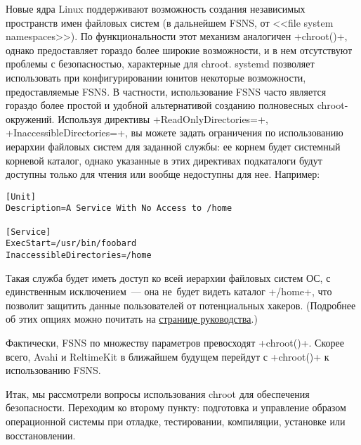 \documentclass[10pt,oneside,a4paper]{article}
\begin{document}
Новые ядра Linux поддерживают возможность создания независимых пространств имен
файловых систем (в дальнейшем FSNS, от <<file system namespaces>>). По
функциональности этот механизм аналогичен +chroot()+, однако предоставляет
гораздо более широкие возможности, и в нем отсутствуют проблемы с безопасностью,
характерные для chroot. systemd позволяет использовать при конфигурировании
юнитов некоторые возможности, предоставляемые FSNS. В частности, использование
FSNS часто является гораздо более простой и удобной альтернативой созданию
полновесных chroot-окружений. Используя директивы +ReadOnlyDirectories=+,
+InaccessibleDirectories=+, вы можете задать ограничения по использованию
иерархии файловых систем для заданной службы: ее корнем будет системный корневой
каталог, однако указанные в этих директивах подкаталоги будут доступны только 
для чтения или вообще недоступны для нее. Например:
\begin{Verbatim}
[Unit]
Description=A Service With No Access to /home

[Service]
ExecStart=/usr/bin/foobard
InaccessibleDirectories=/home
\end{Verbatim}

Такая служба будет иметь доступ ко всей иерархии файловых систем ОС, с
единственным исключением~--- она не~будет видеть каталог +/home+, что позволит
защитить данные пользователей от потенциальных хакеров. (Подробнее об этих
опциях можно почитать на
\href{http://0pointer.de/public/systemd-man/systemd.exec.html}{странице
руководства}.)

Фактически, FSNS по множеству параметров превосходят +chroot()+. Скорее всего,
Avahi и ReltimeKit в ближайшем будущем перейдут с +chroot()+ к использованию
FSNS.

Итак, мы рассмотрели вопросы использования chroot для обеспечения безопасности.
Переходим ко второму пункту: подготовка и управление образом операционной
системы при отладке, тестировании, компиляции, установке или восстановлении.
\end{document}

